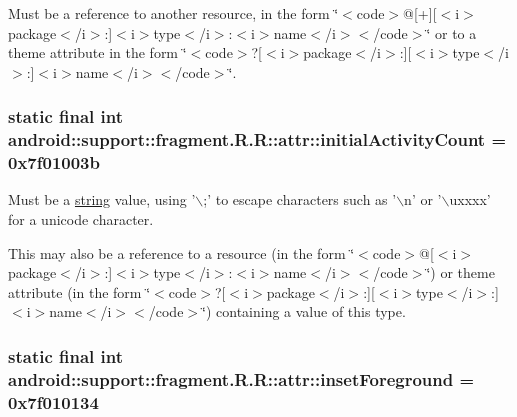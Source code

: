Must be a reference to another resource, in the form \char`\"{}$<$code$>$@\mbox{[}+\mbox{]}\mbox{[}$<$i$>$package$<$/i$>$:\mbox{]}$<$i$>$type$<$/i$>$:$<$i$>$name$<$/i$>$$<$/code$>$\char`\"{} or to a theme attribute in the form \char`\"{}$<$code$>$?\mbox{[}$<$i$>$package$<$/i$>$:\mbox{]}\mbox{[}$<$i$>$type$<$/i$>$:\mbox{]}$<$i$>$name$<$/i$>$$<$/code$>$\char`\"{}. \hypertarget{classandroid_1_1support_1_1fragment_1_1_r_1_1attr_2fc5d7586984416cb1cf665229c08843}{
\subsubsection[{initialActivityCount}]{\setlength{\rightskip}{0pt plus 5cm}static final int android::support::fragment.R.R::attr::initialActivityCount = 0x7f01003b}}
\label{classandroid_1_1support_1_1fragment_1_1_r_1_1attr_2fc5d7586984416cb1cf665229c08843}


Must be a \hyperlink{classandroid_1_1support_1_1fragment_1_1_r_1_1string}{string} value, using '$\backslash$;' to escape characters such as '$\backslash$n' or '$\backslash$uxxxx' for a unicode character. 

This may also be a reference to a resource (in the form \char`\"{}$<$code$>$@\mbox{[}$<$i$>$package$<$/i$>$:\mbox{]}$<$i$>$type$<$/i$>$:$<$i$>$name$<$/i$>$$<$/code$>$\char`\"{}) or theme attribute (in the form \char`\"{}$<$code$>$?\mbox{[}$<$i$>$package$<$/i$>$:\mbox{]}\mbox{[}$<$i$>$type$<$/i$>$:\mbox{]}$<$i$>$name$<$/i$>$$<$/code$>$\char`\"{}) containing a value of this type. \hypertarget{classandroid_1_1support_1_1fragment_1_1_r_1_1attr_e424f9a8785cdca7070a9381f9794524}{
\subsubsection[{insetForeground}]{\setlength{\rightskip}{0pt plus 5cm}static final int android::support::fragment.R.R::attr::insetForeground = 0x7f010134}}
\label{classandroid_1_1support_1_1fragment_1_1_r_1_1attr_e424f9a8785cdca7070a9381f9794524}


